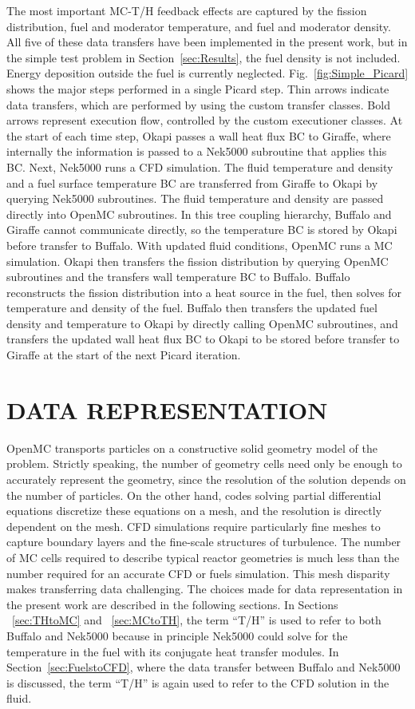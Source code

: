 \documentclass[letterpaper]{physor2018}
\begin{document}
The most important MC-T/H feedback effects are captured by the fission
distribution, fuel and moderator temperature, and fuel and moderator density.
All five of these data transfers have been implemented in the present work,
but in the simple test problem in Section~\ref{sec:Results}, the fuel density
is not included. Energy deposition outside the fuel is currently neglected. Fig.~\ref{fig:Simple_Picard}
shows the major steps performed in a single Picard step.
Thin arrows indicate data transfers, which are performed by using the custom transfer classes.
Bold arrows represent execution flow, controlled by the custom executioner classes.
At the start of each time step, Okapi passes a wall heat flux BC to Giraffe,
where internally the information is passed to a Nek5000 subroutine that applies this BC.
Next, Nek5000 runs a CFD simulation. The fluid temperature and density
and a fuel surface
temperature BC are transferred from Giraffe to Okapi by querying Nek5000 subroutines.
The fluid temperature and density are passed directly into OpenMC subroutines.
In this tree coupling hierarchy, Buffalo and Giraffe cannot
communicate directly, so the temperature BC is stored by Okapi
before transfer to Buffalo.
With updated fluid conditions, OpenMC runs a MC simulation.
Okapi then transfers the fission distribution by querying OpenMC subroutines and
the transfers wall temperature BC to Buffalo. Buffalo reconstructs the fission
distribution into a heat source in the fuel, then solves for temperature and density of the fuel.
Buffalo then transfers the updated fuel density and temperature to Okapi by directly calling
OpenMC subroutines, and transfers the updated wall heat flux BC to Okapi
to be stored before transfer to Giraffe at the start of the next Picard iteration.

\section{DATA REPRESENTATION}
\label{sec:Representation}
OpenMC transports particles on a constructive solid geometry model of the problem.
Strictly speaking, the number of geometry cells need only be
enough to accurately represent the geometry,
since the resolution of the solution depends
on the number of particles. On the other hand,
codes solving partial differential equations discretize these equations on a mesh,
and the resolution is directly dependent on the mesh. CFD simulations
require particularly fine meshes to capture boundary layers and
the fine-scale structures of turbulence.
The number of MC cells required to describe
typical reactor geometries is
much less than the number required for an accurate CFD or fuels simulation. This mesh disparity
makes transferring data challenging.
The choices made for data representation in the present work are described in
the following sections. In Sections
~\ref{sec:THtoMC} and ~\ref{sec:MCtoTH}, the term ``T/H'' is used
to refer to both Buffalo and Nek5000 because
in principle Nek5000 could solve for the temperature in the fuel with its
conjugate heat transfer modules. In Section~\ref{sec:FuelstoCFD}, where
the data transfer between Buffalo and Nek5000 is discussed,
the term ``T/H'' is again used to refer to the CFD solution in the fluid.
\end{document}
